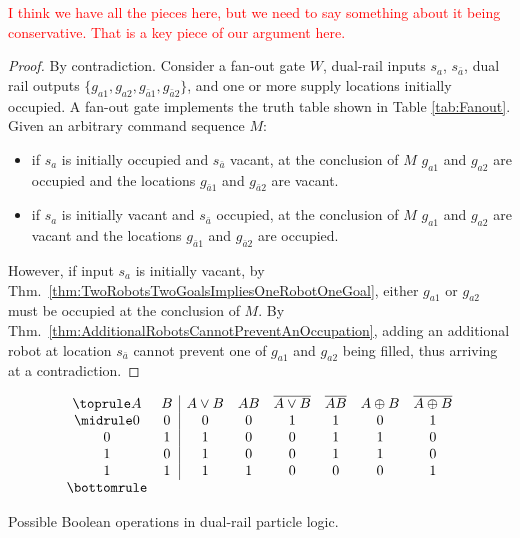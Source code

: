 \documentclass[letterpaper, 10 pt, conference]{ieeeconf}
\begin{document}
\textcolor{red}{I think we have all the pieces here, but we need to say something about it being conservative. That is a key piece of our argument here. }

\begin{proof} By contradiction.
Consider a  {\sc fan-out} gate $W$,  dual-rail inputs  $s_{a}$, $s_{\bar{a}}$, dual rail outputs  $\{g_{a1}, g_{a2},g_{\bar{a}1},g_{\bar{a}2}\}$, and one or more supply locations initially occupied. A   {\sc fan-out} gate implements the truth table shown in Table \ref{tab:Fanout}. Given an arbitrary command sequence $M$:  
\begin{itemize}
\item if $s_{a}$ is initially occupied and $s_{\bar{a}}$ vacant, at the conclusion of $M$ $g_{a1}$ and $g_{a2}$ are occupied and the locations  $g_{\bar{a}1}$ and $g_{\bar{a}2}$ are vacant.
\item if $s_{a}$ is initially vacant and $s_{\bar{a}}$ occupied, at the conclusion of $M$ $g_{a1}$ and $g_{a2}$ are vacant and the locations  $g_{\bar{a}1}$ and $g_{\bar{a}2}$ are occupied.
\end{itemize}

However, if input $s_{a}$ is initially vacant, by Thm.~\ref{thm:TwoRobotsTwoGoalsImpliesOneRobotOneGoal}, either $g_{a1}$ or $g_{a2}$ must be occupied at the conclusion of $M$.  By Thm.~\ref{thm:AdditionalRobotsCannotPreventAnOccupation}, adding an additional robot at location $s_{\bar{a}}$ cannot prevent one of $g_{a1}$ and $g_{a2}$ being filled, thus arriving at a contradiction.
 \end{proof}




\begin{table}
\begin{displaymath}
\begin{array}{cc|cccccc}
\toprule
   A
 & B
 & A\lor{}B
 & AB
 & \overline{A\lor{}B}
 & \overline{AB}
 & A\oplus B
 & \overline{A\oplus B} \\
\midrule
0 & 0 & 0 & 0 & 1 & 1 & 0 & 1 \\
0 & 1 & 1 & 0 & 0 & 1 & 1 & 0 \\
1 & 0 & 1 & 0 & 0 & 1 & 1 & 0 \\
1 & 1 & 1 & 1 & 0 & 0 & 0 & 1 \\
\bottomrule
\end{array}
\end{displaymath}
  \caption{Possible Boolean operations in dual-rail particle logic.}
  \label{tab:dualRailParticleLogic}
\end{table}
  
\end{document}
